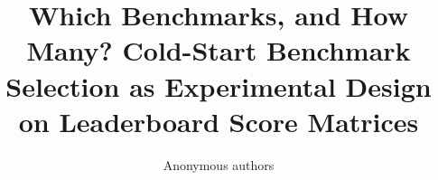 \documentclass{article}
\title{Which Benchmarks, and How Many? Cold-Start Benchmark Selection as Experimental Design on Leaderboard Score Matrices}
\author{Anonymous authors}
\begin{document}
\maketitle

\begin{abstract}

\end{abstract}










{\small}

\appendix



\end{document}

